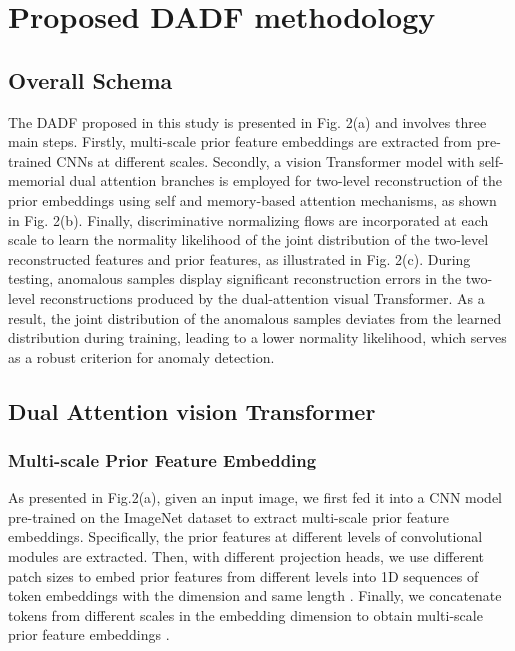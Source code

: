\documentclass[journal]{IEEEtran}
\begin{document}
\section{Proposed DADF methodology}

\subsection{Overall Schema}

The DADF proposed in this study is presented in Fig. 2(a) and involves three main steps. Firstly, multi-scale prior feature embeddings are extracted from pre-trained CNNs at different scales. Secondly, a vision Transformer model with self-memorial dual attention branches is employed for two-level reconstruction of the prior embeddings using self and memory-based attention mechanisms, as shown in Fig. 2(b). Finally, discriminative normalizing flows are incorporated at each scale to learn the normality likelihood of the joint distribution of the two-level reconstructed features and prior features, as illustrated in Fig. 2(c). During testing, anomalous samples display significant reconstruction errors in the two-level reconstructions produced by the dual-attention visual Transformer. As a result, the joint distribution of the anomalous samples deviates from the learned distribution during training, leading to a lower normality likelihood, which serves as a robust criterion for anomaly detection.
 
\subsection{Dual Attention vision Transformer}

\subsubsection{Multi-scale Prior Feature Embedding} 

As presented in Fig.2(a), given an input image, we first fed it into a CNN model pre-trained on the ImageNet dataset to extract multi-scale prior feature embeddings. Specifically, the prior features at different levels of convolutional modules are extracted. Then, with different projection heads, we use different patch sizes  to embed prior features  from different levels into 1D sequences of token embeddings  with the dimension  and same length . Finally, we concatenate tokens from different scales in the embedding dimension to obtain multi-scale prior feature embeddings . 
\end{document}
